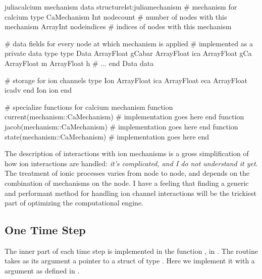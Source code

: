 \begin{inlinelisting}{julia}{calcium mechanism data structure}{lst:juliamechanism}
# mechanism for calcium
type CaMechanism
  Int        nodecount   # number of nodes with this mechanism
  Array{Int} nodeindices # indices of nodes with this mechanism

  # data fields for every node at which mechanism is applied
  # implemented as a private data type
  type Data
    Array{Float} gCabar
    Array{Float} ica
    Array{Float} gCa
    Array{Float} m
    Array{Float} h
    # ...
  end
  Data data

  # storage for ion channels
  type Ion
    Array{Float} ica
    Array{Float} eca
    Array{Float} icadv
  end
  Ion ion
end

# specialize functions for calcium mechanism
function current(mechanism::CaMechanism)
    # implementation goes here
end
function jacob(mechanism::CaMechanism)
    # implementation goes here
end
function state(mechanism::CaMechanism)
    # implementation goes here
end
\end{inlinelisting}

\begin{note}
The description of interactions with ion mechanisms is a gross simplification of how ion interactions are handled: \emph{it's complicated, and I do not understand it yet}.
The treatment of ionic processes varies from node to node, and depends on the combination of mechanisms on the node.
I have a feeling that finding a generic and performant method for handling ion channel interactions will be the trickiest part of optimizing the computational engine.
\end{note}

\subsection{One Time Step}
The inner part of each time step is implemented in the function , in . The routine takes as its argument a pointer to a struct of type . Here we implement it with a  argument as defined in .


